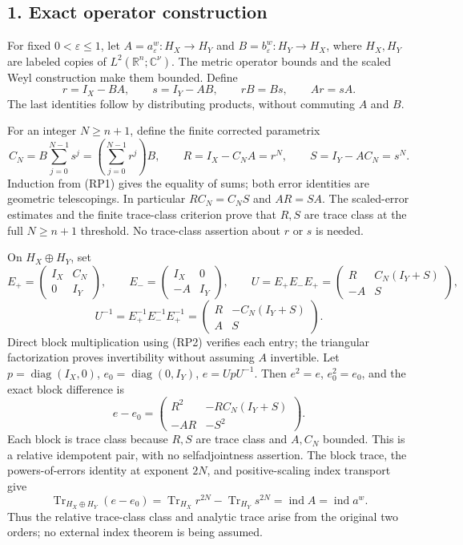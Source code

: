 \documentclass[
  11pt,
]{article}
\begin{document}
\subsection{1. Exact operator
construction}\label{exact-operator-construction}

For fixed \(0<\varepsilon\le1\), let \(A=a_\varepsilon^w:H_X\to H_Y\)
and \(B=b_\varepsilon^w:H_Y\to H_X\), where \(H_X,H_Y\) are labeled
copies of \(L^2(\mathbb R^n;\mathbb C^\nu)\). The metric operator bounds
and the scaled Weyl construction make them bounded. Define \[
 r=I_X-BA,\qquad s=I_Y-AB,\qquad rB=Bs,\qquad Ar=sA.
 \tag{RP1}
\] The last identities follow by distributing products, without
commuting \(A\) and \(B\).

For an integer \(N\ge n+1\), define the finite corrected parametrix \[
 C_N=B\sum_{j=0}^{N-1}s^j
     =\left(\sum_{j=0}^{N-1}r^j\right)B,\qquad
 R=I_X-C_NA=r^N,\qquad S=I_Y-AC_N=s^N.
 \tag{RP2}
\] Induction from (RP1) gives the equality of sums; both error
identities are geometric telescopings. In particular \(RC_N=C_NS\) and
\(AR=SA\). The scaled-error estimates and the finite trace-class
criterion prove that \(R,S\) are trace class at the full \(N\ge n+1\)
threshold. No trace-class assertion about \(r\) or \(s\) is needed.

On \(H_X\oplus H_Y\), set \[
 E_+=\begin{pmatrix}I_X&C_N\\0&I_Y\end{pmatrix},\qquad
 E_-=\begin{pmatrix}I_X&0\\-A&I_Y\end{pmatrix},\qquad
 U=E_+E_-E_+
  =\begin{pmatrix}R&C_N(I_Y+S)\\-A&S\end{pmatrix},
 \tag{RP3}
\] \[
 U^{-1}=E_+^{-1}E_-^{-1}E_+^{-1}
   =\begin{pmatrix}R&-C_N(I_Y+S)\\A&S\end{pmatrix}.
 \tag{RP4}
\] Direct block multiplication using (RP2) verifies each entry; the
triangular factorization proves invertibility without assuming \(A\)
invertible. Let \(p=\operatorname{diag}(I_X,0)\),
\(e_0=\operatorname{diag}(0,I_Y)\), \(e=UpU^{-1}\). Then \(e^2=e\),
\(e_0^2=e_0\), and the exact block difference is \[
 e-e_0=
 \begin{pmatrix}
 R^2&-RC_N(I_Y+S)\\
 -AR&-S^2
 \end{pmatrix}.
 \tag{RP5}
\] Each block is trace class because \(R,S\) are trace class and
\(A,C_N\) bounded. This is a relative idempotent pair, with no
selfadjointness assertion. The block trace, the powers-of-errors
identity at exponent \(2N\), and positive-scaling index transport give
\[
 \operatorname{Tr}_{H_X\oplus H_Y}(e-e_0)
 =\operatorname{Tr}_{H_X}r^{2N}-\operatorname{Tr}_{H_Y}s^{2N}
 =\operatorname{ind}A
 =\operatorname{ind}a^w.
 \tag{RP6}
\] Thus the relative trace-class class and analytic trace arise from the
original two orders; no external index theorem is being assumed.
\end{document}
